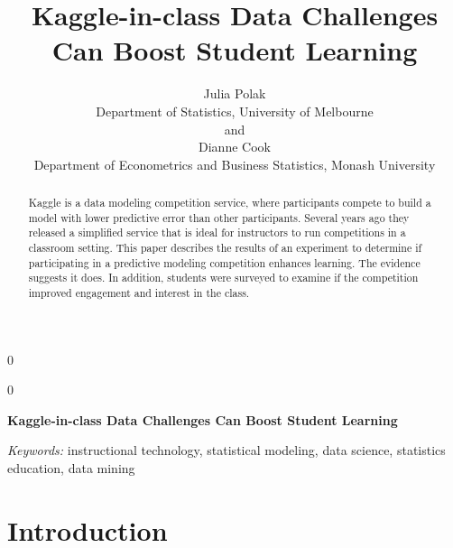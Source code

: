 \documentclass[12pt]{article}
\providecommand{\tightlist}{%
  \setlength{\itemsep}{0pt}\setlength{\parskip}{0pt}}
\newcommand{\blind}{0}
\begin{document}
\def\spacingset#1{\renewcommand{\baselinestretch}%
{#1}\small\normalsize} \spacingset{1}



\blind
{
  \title{\bf Kaggle-in-class Data Challenges Can Boost Student Learning}

  \author{
        Julia Polak \\
    Department of Statistics, University of Melbourne\\
     and \\     Dianne Cook \\
    Department of Econometrics and Business Statistics, Monash University\\
      }
  \maketitle
} \fi

\blind
{
  \bigskip
  \bigskip
  \bigskip
  \begin{center}
    {\LARGE\bf Kaggle-in-class Data Challenges Can Boost Student Learning}
  \end{center}
  \medskip
} \fi

\bigskip
\begin{abstract}
Kaggle is a data modeling competition service, where participants
compete to build a model with lower predictive error than other
participants. Several years ago they released a simplified service that
is ideal for instructors to run competitions in a classroom setting.
This paper describes the results of an experiment to determine if
participating in a predictive modeling competition enhances learning.
The evidence suggests it does. In addition, students were surveyed to
examine if the competition improved engagement and interest in the
class.
\end{abstract}

\noindent%
{\it Keywords:} instructional technology, statistical modeling, data science, statistics education, data mining
\vfill

\newpage
\spacingset{1.45} %

\providecommand{\tightlist}{%
    \setlength{\itemsep}{0pt}\setlength{\parskip}{0pt}}







\section{Introduction}\label{introduction}
\end{document}

